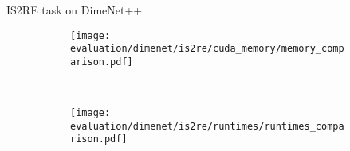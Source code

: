 \begin{frame}{IS2RE task on DimeNet++}
    
    \begin{figure}[H]
        \centering
    
        \begin{subfigure}[t]{0.48\textwidth}
            \centering
            \texttt{[image: evaluation/dimenet/is2re/cuda\_memory/memory\_comparison.pdf]}
        \end{subfigure}%
        ~
        \begin{subfigure}[t]{0.48\textwidth}
            \centering
            \texttt{[image: evaluation/dimenet/is2re/runtimes/runtimes\_comparison.pdf]}
        \end{subfigure}
    
        \vspace*{-0.5em}
    

\end{figure}
\end{frame}
